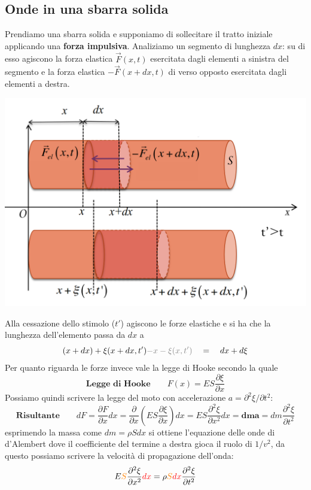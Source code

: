 \documentclass[x11names]{report}
\begin{document}
	\subsection{Onde in una sbarra solida}
	Prendiamo una sbarra solida  e supponiamo di sollecitare  il tratto iniziale applicando una \textbf{forza impulsiva}. Analiziamo un segmento di lunghezza \(dx\): su di esso agiscono la forza elastica \(\vec{F}(x,t)\)  esercitata dagli elementi a sinistra del segmento e la forza elastica \(-\vec{F}(x + dx,t)\) di verso opposto esercitata dagli elementi a destra.
	
		\begin{center}
				\includegraphics[scale=0.3]{imgs/ondeinsbarra.png}
		\end{center}
	
	\noindent
	Alla cessazione dello stimolo (\(t'\)) agiscono le forze elastiche e si ha che la lunghezza dell'elemento passa da \(dx\) a 
	\[ 
	(x + dx) + \xi(x+dx,t') \textcolor{gray}{-x - \xi(x,t') } \quad = \quad dx + d\xi
	\]
	Per quanto riguarda le forze invece vale la legge di Hooke secondo la quale
	\[ 
	\textbf{Legge di Hooke} \qquad	F(x) = ES\frac{\partial\xi}{\partial x}
	\]
	Possiamo quindi scrivere la legge del moto con accelerazione \(a = \partial^2 \xi / \partial t^2\):
	\[ 
	\textbf{Risultante} \qquad	dF = \frac{\partial F}{\partial x}dx = \frac{\partial}{\partial x}\left(ES\frac{\partial\xi}{\partial x}\right)dx = ES\frac{\partial^2\xi}{\partial x^2}dx \mathbf{= dm a} = dm \frac{\partial^2 \xi}{\partial t^2}
	\]
	esprimendo la massa come \(dm = \rho S dx\) si ottiene l'equazione delle onde di d'Alembert dove il coefficiente del termine a destra gioca il ruolo di \(1/v^2\), da questo possiamo scrivere la velocità di propagazione dell'onda:
	\[ 
	E\textcolor{orange}{S}\frac{\partial^2\xi}{\partial x^2}\textcolor{red}{dx} = \rho \textcolor{orange}{S} \textcolor{red}{dx} \frac{\partial^2 \xi}{\partial t^2}
	\]
	
\end{document}
